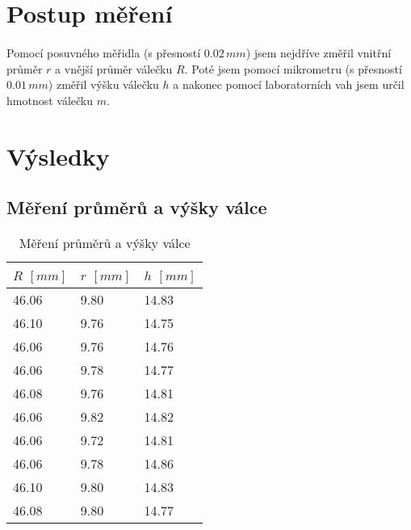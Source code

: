 \documentclass[a4paper,11pt]{article}
\begin{document}
\section{Postup měření}

    \paragraph{} Pomocí posuvného měřidla (s přesností $0.02\,mm$) jsem 
    nejdříve změřil vnitřní průměr $r$ a vnější průměr válečku $R$. Poté jsem
    pomocí mikrometru (s přesností $0.01\,mm$) změřil výšku válečku $h$ a 
    nakonec pomocí laboratorních vah jsem určil hmotnost válečku $m$.

\section{Výsledky}

    \subsection{Měření průměrů a výšky válce}

     \begin{table}[h]
        \centering
            \begin{tabular}{ | l | l | l | }
                \hline
                $R$ $[mm]$ & $r$ $[mm]$& $h$ $[mm]$ \\ \hline
                46.06 & 9.80 & 14.83 \\ \hline
                46.10 & 9.76 & 14.75 \\ \hline
                46.06 & 9.76 & 14.76 \\ \hline
                46.06 & 9.78 & 14.77 \\ \hline
                46.08 & 9.76 & 14.81 \\ \hline
                46.06 & 9.82 & 14.82 \\ \hline
                46.06 & 9.72 & 14.81 \\ \hline
                46.06 & 9.78 & 14.86 \\ \hline
                46.10 & 9.80 & 14.83 \\ \hline
                46.08 & 9.80 & 14.77 \\
                \hline
            \end{tabular}
        \caption{Měření průměrů a výšky válce}
        \label{fig:method_b}
    \end{table}
\end{document}
